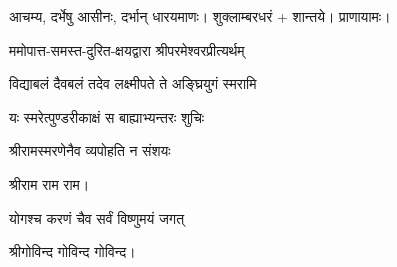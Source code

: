 आचम्य, दर्भेषु आसीनः, दर्भान् धारयमाणः। शुक्लाम्बरधरं + शान्तये। प्राणायामः।

ममोपात्त-समस्त-दुरित-क्षयद्वारा श्रीपरमेश्वरप्रीत्यर्थम्

{विद्याबलं दैवबलं तदेव लक्ष्मीपते ते अङ्घ्रियुगं स्मरामि}

{यः स्मरेत्पुण्डरीकाक्षं स बाह्याभ्यन्तरः शुचिः}

{श्रीरामस्मरणेनैव व्यपोहति न संशयः}

श्रीराम राम राम।

{योगश्च करणं चैव सर्वं विष्णुमयं जगत्}

श्रीगोविन्द गोविन्द गोविन्द।

